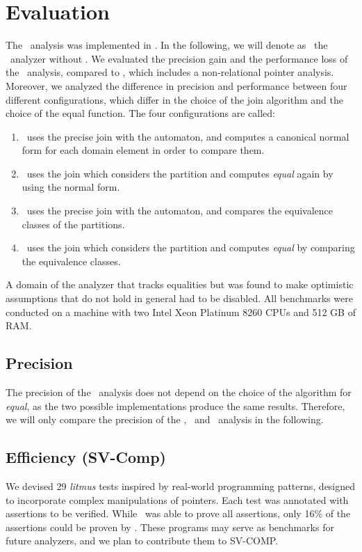 \chapter{Evaluation}


The \cpo\ analysis was implemented in \goblint.
In the following, we will denote as \base\ the \goblint\ analyzer without \cpo.
We evaluated the precision gain and the performance loss of the \cpo\ analysis, compared to \base, which includes a non-relational pointer analysis.
Moreover, we analyzed the difference in precision and performance between four different
configurations, which differ in the choice of the join algorithm and the choice of the equal function.
The four configurations are called:
\begin{enumerate}
\item \cpou\ uses the precise join with the automaton, and computes a canonical normal form for each domain element in order to compare them.
\item \cpod\ uses the join which considers the partition and computes \emph{equal} again by using the normal form.
\item \cpot\ uses the precise join with the automaton, and compares the equivalence classes of the partitions.
\item \cpoq\ uses the join which considers the partition and computes \emph{equal} by comparing the equivalence classes.
\end{enumerate}
A domain of the analyzer that tracks equalities but was found to make optimistic assumptions that do not hold in general had to be disabled.
All benchmarks were conducted on a machine with two Intel Xeon Platinum 8260 CPUs and 512 GB of RAM.

\section{Precision}

The precision of the \cpo\ analysis does not depend on the choice of the algorithm for \emph{equal}, as the two possible implementations produce the same results.
Therefore, we will only compare the precision of the \cpou, \cpod\ and \base\ analysis in the following.


\section{Efficiency (SV-Comp)}


We devised 29 \emph{litmus} tests inspired by real-world programming patterns,
designed to incorporate complex manipulations of pointers.
Each test was annotated with assertions to be verified.
While \cpo\ was able to prove all assertions,
only 16\% of the assertions could be proven by \base.
These programs may serve as benchmarks for future analyzers,
and we plan to contribute them to SV-COMP.

